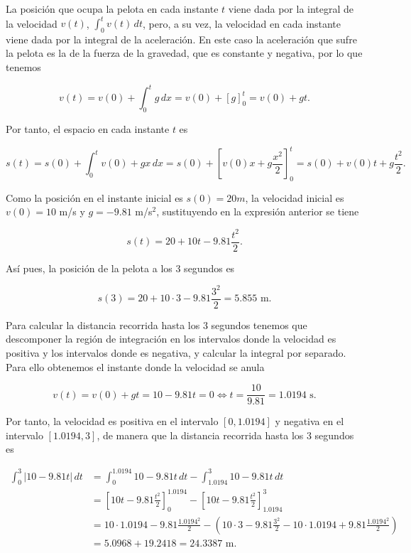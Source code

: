 \documentclass[
  spanish,
  a4paper,
]{scrreport}
\theoremstyle{definition}
\theoremstyle{remark}
\begin{document}
\begin{tcolorbox}[enhanced jigsaw, arc=.35mm, bottomrule=.15mm, bottomtitle=1mm, breakable, colback=white, colbacktitle=quarto-callout-tip-color!10!white, colframe=quarto-callout-tip-color-frame, coltitle=black, left=2mm, leftrule=.75mm, opacityback=0, opacitybacktitle=0.6, rightrule=.15mm, title=\textcolor{quarto-callout-tip-color}{\faLightbulb}\hspace{0.5em}{Solución}, titlerule=0mm, toprule=.15mm, toptitle=1mm]

La posición que ocupa la pelota en cada instante \(t\) viene dada por la
integral de la velocidad \(v(t)\), \(\int_0^t v(t)\, dt\), pero, a su
vez, la velocidad en cada instante viene dada por la integral de la
aceleración. En este caso la aceleración que sufre la pelota es la de la
fuerza de la gravedad, que es constante y negativa, por lo que tenemos

\[
v(t) = v(0) + \int_0^t g \,dx = v(0) + [g]_0^t = v(0) + gt.
\]

Por tanto, el espacio en cada instante \(t\) es

\[
s(t) = s(0) + \int_0^t v(0) + gx\,dx = s(0) + \left[v(0)x+g\frac{x^2}{2}\right]_0^t = s(0) + v(0)t + g\frac{t^2}{2}.
\]

Como la posición en el instante inicial es \(s(0) = 20 m\), la velocidad
inicial es \(v(0) = 10\) m/s y \(g=-9.81\) m/s\(^2\), sustituyendo en la
expresión anterior se tiene

\[
s(t) = 20 + 10 t - 9.81 \frac{t^2}{2}.
\]

Así pues, la posición de la pelota a los 3 segundos es

\[
s(3) = 20 + 10\cdot 3 -9.81 \frac{3^2}{2} = 5.855 \mbox{ m}.
\]

Para calcular la distancia recorrida hasta los 3 segundos tenemos que
descomponer la región de integración en los intervalos donde la
velocidad es positiva y los intervalos donde es negativa, y calcular la
integral por separado. Para ello obtenemos el instante donde la
velocidad se anula

\[
v(t) = v(0) + gt = 10 - 9.81 t = 0 \Leftrightarrow t = \frac{10}{9.81} = 1.0194 \mbox{ s}.
\]

Por tanto, la velocidad es positiva en el intervalo \([0, 1.0194]\) y
negativa en el intervalo \([1.0194, 3]\), de manera que la distancia
recorrida hasta los 3 segundos es

\begin{align*}
\int_0^3 |10 -9.81 t|\,dt 
&= \int_0^{1.0194} 10 -9.81 t\,dt - \int_{1.0194}^3 10 -9.81 t\,dt \\
& = \left[10t-9.81\frac{t^2}{2}\right]_0^{1.0194} - \left[10t-9.81\frac{t^2}{2}\right]_{1.0194}^3 \\
&= 10\cdot 1.0194 - 9.81 \frac{1.0194^2}{2} - \left(10\cdot 3 -9.81\frac{3^2}{2} - 10\cdot 1.0194 + 9.81 \frac{1.0194^2}{2}\right) \\
&= 5.0968 + 19.2418  = 24.3387 \mbox { m}.
\end{align*}

\end{tcolorbox}
\end{document}
